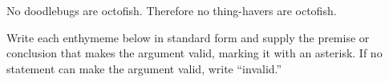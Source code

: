 \begin{exercises}
\item No doodlebugs are octofish. Therefore no thing-havers are octofish.





\end{exercises}

\noindent \problempart Write each enthymeme below in standard form and supply the premise or conclusion that makes the argument valid, marking it with an asterisk. If no statement can make the argument valid, write ``invalid.''

